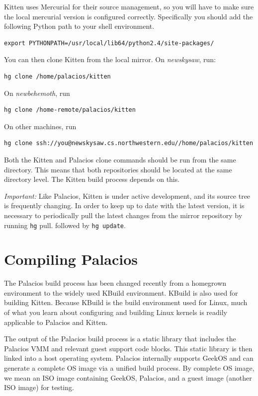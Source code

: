 \documentclass[11pt]{article}
\begin{document}
Kitten uses Mercurial for their source management, so you will have to
make sure the local mercurial version is configured correctly.
Specifically you should add the following Python path to your shell environment.

\begin{verbatim}
export PYTHONPATH=/usr/local/lib64/python2.4/site-packages/
\end{verbatim}

You can then clone Kitten from the local mirror.   On {\em newskysaw},
run: 
\begin{verbatim}
hg clone /home/palacios/kitten
\end{verbatim}
On {\em newbehemoth}, run
\begin{verbatim}
hg clone /home-remote/palacios/kitten
\end{verbatim}
On other machines, run
\begin{verbatim}
hg clone ssh://you@newskysaw.cs.northwestern.edu//home/palacios/kitten
\end{verbatim}


Both the Kitten and Palacios clone commands should be run from the
same directory. This means that both repositories should be located at
the same directory level. The Kitten build process depends on this.

{\em Important:} Like Palacios, Kitten is under active development,
and its source tree is frequently changing. In order to keep up to
date with the latest version, it is necessary to periodically pull the
latest changes from the mirror repository by running \verb.hg.
pull. followed by \verb.hg update..

\section{Compiling Palacios}

The Palacios build process has been changed recently from a homegrown
environment to the widely used KBuild environment.  KBuild is also
used for building Kitten.  Because KBuild is the build environment
used for Linux, much of what you learn about configuring and building
Linux kernels is readily applicable to Palacios and Kitten. 

The output of the Palacios build process is a static library that
includes the Palacios VMM and relevant guest support code blocks. This
static library is then linked into a host operating system. Palacios
internally supports GeekOS and can generate a complete OS image via a
unified build process.  By complete OS image, we mean an ISO image
containing GeekOS, Palacios, and a guest image (another ISO image) for
testing. 
\end{document}
